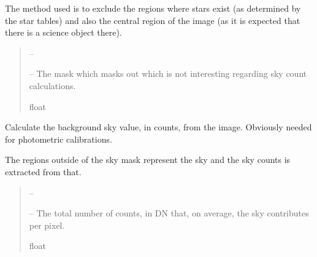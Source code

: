 \documentclass[letterpaper,11pt,english]{sphinxmanual}
\begin{document}
\begin{savenotes}
\begin{fulllineitems}
\begin{savenotes}
\begin{fulllineitems}
\sphinxAtStartPar
The method used is to exclude the regions where stars exist (as
determined by the star tables) and also the central region
of the image (as it is expected that there is a science object there).
\begin{quote}\begin{description}
\sphinxAtStartPar
{} – 

\sphinxAtStartPar
{} – The mask which masks out which is not interesting regarding sky
count calculations.

\sphinxAtStartPar
float

\end{description}\end{quote}

\end{fulllineitems}\end{savenotes}


\begin{savenotes}\begin{fulllineitems}
\label{\detokenize{code/opihiexarata.photometry.solution:opihiexarata.photometry.solution.PhotometricSolution.__calculate_sky_counts_value}}
\pysigstartsignatures
{}
\pysigstopsignatures
\sphinxAtStartPar
Calculate the background sky value, in counts, from the image.
Obviously needed for photometric calibrations.

\sphinxAtStartPar
The regions outside of the sky mask represent the sky and the sky
counts is extracted from that.
\begin{quote}\begin{description}
\sphinxAtStartPar
{} – 

\sphinxAtStartPar
{} – The total number of counts, in DN that, on average, the sky
contributes per pixel.

\sphinxAtStartPar
float

\end{description}\end{quote}


\end{fulllineitems}
\end{savenotes}
\end{fulllineitems}
\end{savenotes}
\end{document}
